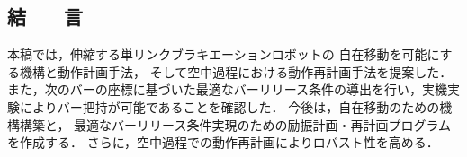 \begin{small}
\section{結　　言}
\vspace{-2mm}
本稿では，伸縮する単リンクブラキエーションロボットの
自在移動を可能にする機構と動作計画手法，
そして空中過程における動作再計画手法を提案した．
また，次のバーの座標に基づいた最適なバーリリース条件の導出を行い，実機実験によりバー把持が可能であることを確認した．
今後は，自在移動のための機構構築と，
最適なバーリリース条件実現のための励振計画・再計画プログラムを作成する．
さらに，空中過程での動作再計画によりロバスト性を高める．
\vspace{-5mm}
{
\scriptsize %

% 


}



\end{small}




     
      
     

